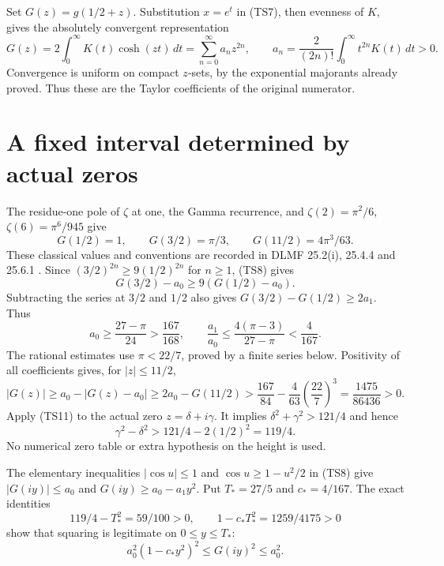 \documentclass[11pt]{article}
\newcommand{\dd}{\,d}
\begin{document}
Set $G(z)=g(1/2+z)$. Substitution $x=e^t$ in (TS7), then evenness
of $K$, gives the absolutely convergent representation
\begin{equation}\tag{TS8}
 G(z)=2\int_0^\infty K(t)\cosh(zt)\dd t
 =\sum_{n=0}^\infty a_nz^{2n},\qquad
 a_n=\frac2{(2n)!}\int_0^\infty t^{2n}K(t)\dd t>0.
\end{equation}
Convergence is uniform on compact $z$-sets, by the exponential
majorants already proved. Thus these are the Taylor coefficients
of the original numerator.

\section{A fixed interval determined by actual zeros}
The residue-one pole of $\zeta$ at one, the Gamma recurrence, and
$\zeta(2)=\pi^2/6$, $\zeta(6)=\pi^6/945$ give
\begin{equation}\tag{TS9}
 G(1/2)=1,\qquad G(3/2)=\pi/3,\qquad G(11/2)=4\pi^3/63.
\end{equation}
These classical values and conventions are recorded in DLMF
25.2(i), 25.4.4 and 25.6.1 \cite{zeta,zetavalues}.
Since $(3/2)^{2n}\geq9(1/2)^{2n}$ for $n\geq1$, (TS8) gives
\[
 G(3/2)-a_0\geq9(G(1/2)-a_0).
\]
Subtracting the series at $3/2$ and $1/2$ also gives
$G(3/2)-G(1/2)\geq2a_1$. Thus
\begin{equation}\tag{TS10}
 a_0\geq\frac{27-\pi}{24}>\frac{167}{168},\qquad
 \frac{a_1}{a_0}\leq\frac{4(\pi-3)}{27-\pi}<\frac4{167}.
\end{equation}
The rational estimates use $\pi<22/7$, proved by a finite series
below. Positivity of all coefficients gives, for $|z|\leq11/2$,
\begin{equation}\tag{TS11}
 |G(z)|\geq a_0-|G(z)-a_0|
 \geq2a_0-G(11/2)
 >\frac{167}{84}-\frac4{63}\left(\frac{22}{7}\right)^3
 =\frac{1475}{86436}>0.
\end{equation}
Apply (TS11) to the actual zero $z=\delta+i\gamma$. It implies
$\delta^2+\gamma^2>121/4$ and hence
\begin{equation}\tag{TS12}
 \gamma^2-\delta^2>121/4-2(1/2)^2=119/4.
\end{equation}
No numerical zero table or extra hypothesis on the height is used.

The elementary inequalities $|\cos u|\leq1$ and
$\cos u\geq1-u^2/2$ in (TS8) give
$|G(iy)|\leq a_0$ and $G(iy)\geq a_0-a_1y^2$.
Put $T_*=27/5$ and $c_*=4/167$. The exact identities
\[
 119/4-T_*^2=59/100>0,\qquad
 1-c_*T_*^2=1259/4175>0
\]
show that squaring is legitimate on $0\leq y\leq T_*$:
\begin{equation}\tag{TS13}
 a_0^2(1-c_*y^2)^2\leq G(iy)^2\leq a_0^2.
\end{equation}
\end{document}
